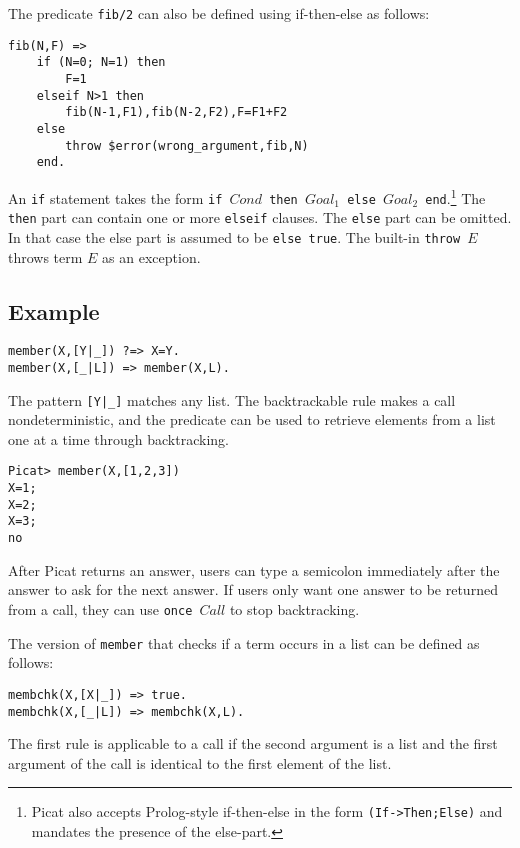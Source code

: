 The predicate \texttt{fib/2} can also be defined using if-then-else as follows:
\begin{verbatim}
fib(N,F) => 
    if (N=0; N=1) then 
        F=1 
    elseif N>1 then 
        fib(N-1,F1),fib(N-2,F2),F=F1+F2
    else 
        throw $error(wrong_argument,fib,N)
    end.
\end{verbatim}
An \texttt{if} statement takes the form \texttt{if $Cond$ then $Goal_1$ else $Goal_2$ end}.\footnote{Picat also accepts Prolog-style if-then-else in the form \texttt{(If->Then;Else)} and mandates the presence of the else-part.} The \texttt{then} part can contain one or more \texttt{elseif} clauses. The \texttt{else} part can be omitted. In that case the else part is assumed to be \texttt{else true}. The built-in \texttt{throw $E$} throws term $E$ as an exception.

\subsection*{Example}
\begin{verbatim}
member(X,[Y|_]) ?=> X=Y.
member(X,[_|L]) => member(X,L).
\end{verbatim}

The pattern \verb+[Y|_]+ matches any list. The backtrackable rule makes a call nondeterministic, and the predicate can be used to retrieve elements from a list one at a time through backtracking.
\begin{verbatim}
Picat> member(X,[1,2,3])
X=1;
X=2;
X=3;
no
\end{verbatim}
After Picat returns an answer, users can type a semicolon immediately after the answer to ask for the next answer. If users only want one answer to be returned from a call, they can use \texttt{once $Call$} to stop backtracking.

The version of \texttt{member} that checks if a term occurs in a list can be defined as follows:
\begin{verbatim}
membchk(X,[X|_]) => true.
membchk(X,[_|L]) => membchk(X,L).
\end{verbatim}
The first rule is applicable to a call if the second argument is a list and the first argument of the call is identical to the first element of the list.

